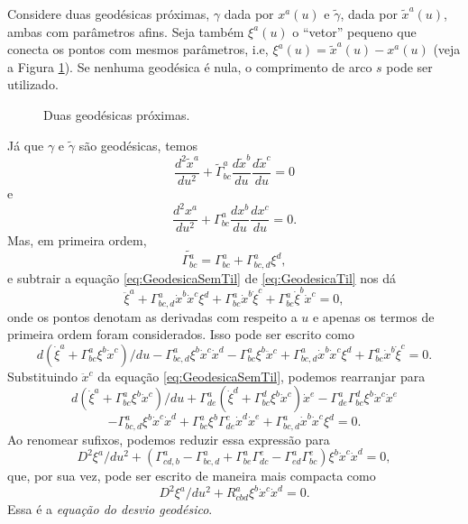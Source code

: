 Considere duas geodésicas próximas, $\gamma$ dada por $x^a(u)$ e $\tilde{\gamma}$, dada por $\tilde{x}^a(u)$, ambas com parâmetros afins. Seja também $\xi^a(u)$ o ``vetor'' pequeno que conecta os pontos com mesmos parâmetros, i.e, $\xi^a(u)=\tilde{x}^a(u)-x^a(u)$ (veja a Figura \ref{fig:DesvioGeodesico}). Se nenhuma geodésica é nula, o comprimento de arco $s$ pode ser utilizado.

\begin{figure}[th]
	\centering
	\caption{Duas geodésicas próximas.}
	\label{fig:DesvioGeodesico}
\end{figure}

Já que $\gamma$ e $\tilde{\gamma}$ são geodésicas, temos
\begin{equation}\label{eq:GeodesicaTil}
	\frac{d^2\tilde{x}^a}{du^2}+\tilde{\Gamma}^a_{bc}\frac{d\tilde{x}^b}{du}\frac{d\tilde{x}^c}{du}=0
\end{equation}
e
\begin{equation}\label{eq:GeodesicaSemTil}
	\frac{d^2x^a}{du^2}+{\Gamma}^a_{bc}\frac{dx^b}{du}\frac{dx^c}{du}=0.
\end{equation}
Mas, em primeira ordem,
\[
	\tilde{\Gamma^a_{bc}}=\Gamma^a_{bc}+\Gamma^a_{bc,d}\xi^d,
\]
e subtrair a equação \eqref{eq:GeodesicaSemTil} de \eqref{eq:GeodesicaTil} nos dá
\[
	\ddot{\xi}^a+\Gamma^a_{bc,d}\dot{x}^b\dot{x}^c\xi^d+\Gamma^a_{bc}\dot{x}^b\dot{\xi}^c+\Gamma^a_{bc}\dot{\xi}^b\dot{x}^c=0,
\]
onde os pontos denotam as derivadas com respeito a $u$ e apenas os termos de primeira ordem foram considerados. Isso pode ser escrito como
\[
	d(\dot{\xi}^a+  \Gamma^a_{bc}\xi^b\dot{x}^c)/du -
	\Gamma^a_{bc,d}\xi^b\dot{x}^c\dot{x}^d -
	\Gamma^a_{bc}\xi^b\ddot{x}^c +
	\Gamma^a_{bc,d}\dot{x}^b\dot{x}^c\xi^d +
	\Gamma^a_{bc}\dot{x}^b\dot{\xi}^c = 0 .
\]
Substituindo $\ddot{x}^c$ da equação \eqref{eq:GeodesicaSemTil}, podemos rearranjar para
\[
	d(\dot{\xi}^a+  \Gamma^a_{bc}\xi^b\dot{x}^c)/du +
	\Gamma^a_{de}(\dot{\xi}^d+\Gamma^d_{bc}\xi^b\dot{x}^c)\dot{x}^e -
	\Gamma^a_{de}\Gamma^d_{bc}\xi^b\dot{x}^c\dot{x}^e 
\]
\[
	- \Gamma^a_{bc,d}\xi^b\dot{x}^c\dot{x}^d+
	\Gamma^a_{bc}\xi^b\Gamma^c_{de}\dot{x}^d\dot{x}^e +
	\Gamma^a_{bc,d}\dot{x}^b\dot{x}^c\xi^d = 0 .
\]
Ao renomear sufixos, podemos reduzir essa expressão para
\[
	D^2\xi^a/du^2+(
		\Gamma^a_{cd,b} - \Gamma^a_{bc,d}+\Gamma^a_{be}\Gamma^e_{dc}-\Gamma^a_{ed}\Gamma^e_{bc}
		)\xi^b\dot{x}^c\dot{x}^d = 0 , 
\]
que, por sua vez, pode ser escrito de maneira mais compacta como
\begin{equation}\label{eq:DesvioGeodesico}
	\boxed{
	D^2\xi^a/du^2 + R^a_{cbd}\xi^b\dot{x}^c\dot{x}^d=0.
	}
\end{equation}
Essa é a \textit{equação do desvio geodésico}. 

